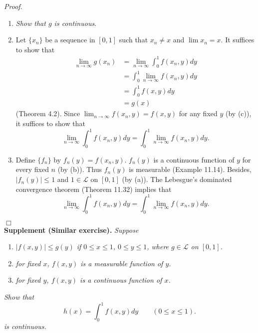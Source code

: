 \documentclass{article}
\begin{document}
\emph{Proof.}
\begin{enumerate}
\item[(1)]
  \emph{Show that $g$ is continuous.}

\item[(2)]
  Let $\{ x_n \}$ be a sequence in $[0,1]$ such that
  $x_n \neq x$ and $\lim x_n = x$.
  It suffices to show that
  \begin{align*}
    \lim_{n \to \infty} g(x_n)
    &= \lim_{n \to \infty} \int_{0}^{1} f(x_n,y) dy \\
    &= \int_{0}^{1} \lim_{n \to \infty} f(x_n,y) dy \\
    &= \int_{0}^{1} f(x,y) dy \\
    &= g(x)
  \end{align*}
  (Theorem 4.2).
  Since $\lim_{n \to \infty} f(x_n,y) = f(x,y)$ for any fixed $y$ (by (c)),
  it suffices to show that
  \[
    \lim_{n \to \infty} \int_{0}^{1} f(x_n,y) dy
    = \int_{0}^{1} \lim_{n \to \infty} f(x_n,y) dy.
  \]

\item[(3)]
  Define $\{f_n\}$ by $f_n(y) = f(x_n,y)$.
  $f_n(y)$ is a continuous function of $y$ for every fixed $n$ (by (b)).
  Thus $f_n(y)$ is measurable (Example 11.14).
  Besides, $|f_n(y)| \leq 1$ and $1 \in \mathscr{L}$ on $[0,1]$ (by (a)).
  The Lebesgue's dominated convergence theorem (Theorem 11.32) implies that
  \[
    \lim_{n \to \infty} \int_{0}^{1} f(x_n,y) dy
    = \int_{0}^{1} \lim_{n \to \infty} f(x_n,y) dy.
  \]
\end{enumerate}
$\Box$ \\



\textbf{Supplement (Similar exercise).}
\emph{Suppose}
\begin{enumerate}
\item[(a)]
  \emph{$|f(x,y)| \leq g(y)$ if $0 \leq x \leq 1$, $0 \leq y \leq 1$,
  where $g \in \mathscr{L}$ on $[0,1]$.}

\item[(b)]
  \emph{for fixed $x$, $f(x,y)$ is a measurable function of $y$.}

\item[(c)]
  \emph{for fixed $y$, $f(x,y)$ is a continuous function of $x$.}
\end{enumerate}
\emph{Show that
\[
  h(x) = \int_{0}^{1} f(x,y) dy
  \qquad
  (0 \leq x \leq 1).
\]
is continuous.} \\\\
\end{document}
